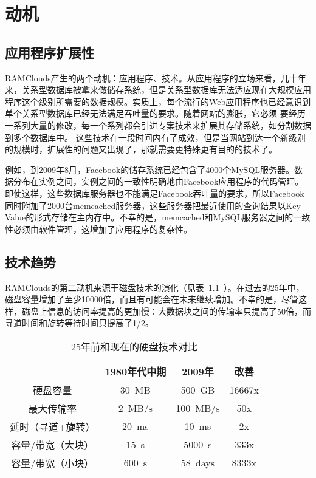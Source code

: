 \documentclass[translation]{zjutreport}
\begin{document}
\chapter{动机}
\section{应用程序扩展性}
RAMClouds产生的两个动机：应用程序、技术。从应用程序的立场来看，几十年来，关系型数据库被拿来做储存系统，但是关系型数据库无法适应现在大规模应用程序这个级别所需要的数据规模。实质上，每个流行的Web应用程序也已经意识到单个关系型数据库已经无法满足吞吐量的要求。随着网站的膨胀，它必须
要经历一系列大量的修改，每一个系列都会引进专案技术来扩展其存储系统，如分割数据到多个数据库中。
这些技术在一段时间内有了成效，但是当网站到达一个新级别的规模时，扩展性的问题又出现了，那就需要更特殊更有目的的技术了。

例如，到2009年8月，Facebook的储存系统已经包含了4000个MySQL服务器。数据分布在实例之间，实例之间的一致性明确地由Facebook应用程序的代码管理。即使这样，这些数据库服务器也不能满足Facebook吞吐量的要求，所以Facebook同时附加了2000台memcached服务器，这些服务器把最近使用的查询结果以Key-Value的形式存储在主内存中。不幸的是，memcached和MySQL服务器之间的一致性必须由软件管理，这增加了应用程序的复杂性。

\section{技术趋势}
RAMClouds的第二动机来源于磁盘技术的演化（见表~\ref{tab:table2}~）。在过去的25年中，磁盘容量增加了至少10000倍，而且有可能会在未来继续增加。不幸的是，尽管这样，磁盘上信息的访问率提高的更加慢：大数据块之间的传输率只提高了50倍，而寻道时间和旋转等待时间只提高了1/2。

\begin{table}[htbp]
\caption{25年前和现在的硬盘技术对比}\label{tab:table2}
\vspace{0.5em}
\begin{center}
{\wuhao
\begin{tabular}{cccc}
\toprule[1.5pt]
 & 1980年代中期 & 2009年 & 改善\\
\midrule[1pt]
硬盘容量 & 30~MB & 500~GB & 16667x\\
最大传输率 & 2~MB/s & 100~MB/s & 50x \\
延时（寻道+旋转）& 20~ms & 10~ms & 2x \\
容量/带宽（大块） & 15~s & 5000~s & 333x \\
容量/带宽（小块） & 600~s & 58~days & 8333x \\
\bottomrule[1.5pt]
\end{tabular}}
\end{center}
\vspace{\baselineskip}
\end{table}
\end{document}
